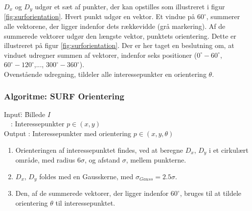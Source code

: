 $D_x$ og $D_y$ udgør et sæt af punkter, der kan opstilles som illustreret i figur \ref{fig:surforientation}. Hvert punkt udgør en vektor. Et vindue på $60^{\circ}$, summerer alle vektorene, der ligger indenfor dets rækkevidde (grå markering). Af de summerede vektorer udgør den længste vektor, punktets orientering. Dette er illustreret på figur \ref{fig:surforientation}. Der er her taget en beslutning om, at vinduet udregner summen af vektorer, indenfor seks positioner ($0^{\circ}-60^{\circ}$, $60^{\circ}-120^{\circ}$,..., $300^{\circ}-360^{\circ}$).
\\
Ovenstående udregning, tildeler alle interessepunkter en orientering $\theta$.
\subsubsection*{Algoritme: SURF Orientering}
\begin{tabbing}
Input\quad \= : \= Billede $I$\\
$\text{ }$ \> : \>  Interessepunkter $p \in (x, y)$ \\
Output \text{ } \> : \> Interessepunkter med orientering $p \in (x, y, \theta)$
\end{tabbing}
\begin{enumerate}
\item Orienteringen af interessepunktet findes, ved at beregne $D_x$, $D_y$ i et cirkulært område, med radius $6\sigma$, og afstand $\sigma$, mellem punkterne. 
\item $D_x$, $D_y$ foldes med en Gausskerne, med $\sigma_{Gauss} = 2.5\sigma $.
\item Den, af de summerede vektorer, der ligger indenfor $60^{\circ}$, bruges til at tildele orientering $\theta$ til interessepunktet.
\end{enumerate}